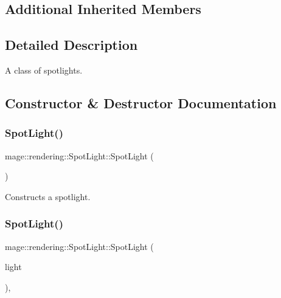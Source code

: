 \subsection*{Additional Inherited Members}


\subsection{Detailed Description}
A class of spotlights. 

\subsection{Constructor \& Destructor Documentation}
\hypertarget{classmage_1_1rendering_1_1_spot_light_abc287714a0bb8f4fab5960b7bcbb4316}{}\label{classmage_1_1rendering_1_1_spot_light_abc287714a0bb8f4fab5960b7bcbb4316} 
\subsubsection{\texorpdfstring{Spot\+Light()}{SpotLight()}\hspace{0.1cm}{\footnotesize\ttfamily [1/3]}}
{\footnotesize\ttfamily mage\+::rendering\+::\+Spot\+Light\+::\+Spot\+Light (\begin{DoxyParamCaption}{ }\end{DoxyParamCaption})\hspace{0.3cm}{\ttfamily [noexcept]}}

Constructs a spotlight. \hypertarget{classmage_1_1rendering_1_1_spot_light_a3e94a01b574efb8af5540e24d7af75c6}{}\label{classmage_1_1rendering_1_1_spot_light_a3e94a01b574efb8af5540e24d7af75c6} 
\subsubsection{\texorpdfstring{Spot\+Light()}{SpotLight()}\hspace{0.1cm}{\footnotesize\ttfamily [2/3]}}
{\footnotesize\ttfamily mage\+::rendering\+::\+Spot\+Light\+::\+Spot\+Light (\begin{DoxyParamCaption}\item[{const \hyperlink{classmage_1_1rendering_1_1_spot_light}{Spot\+Light} \&}]{light }\end{DoxyParamCaption})\hspace{0.3cm}{\ttfamily [default]}, {\ttfamily [noexcept]}}


